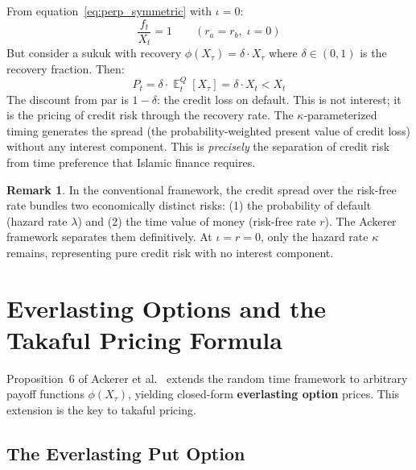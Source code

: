 \documentclass[10pt,twocolumn]{article}
\theoremstyle{plain}
\theoremstyle{definition}
\newtheorem{remark}{Remark}
\DeclareMathOperator{\E}{\mathbb{E}}
\begin{document}
From equation~\eqref{eq:perp_symmetric} with $\iota = 0$:
\begin{equation}
\frac{f_t}{X_t} = 1
\qquad (r_a = r_b,\;\iota = 0)
\label{eq:parity}
\end{equation}
But consider a sukuk with recovery $\phi(X_\tau) = \delta \cdot X_\tau$
where $\delta \in (0,1)$ is the recovery fraction. Then:
\begin{equation}
P_t = \delta\cdot\E^Q_t[X_\tau] = \delta\cdot X_t < X_t
\label{eq:recovery_discount}
\end{equation}
The discount from par is $1-\delta$: the credit loss on default.
This is not interest; it is the pricing of credit risk through
the recovery rate. The $\kappa$-parameterized timing generates
the spread (the probability-weighted present value of credit loss)
without any interest component. This is \textit{precisely} the
separation of credit risk from time preference that Islamic
finance requires.

\begin{remark}
In the conventional framework, the credit spread over the risk-free
rate bundles two economically distinct risks: (1) the probability
of default (hazard rate $\lambda$) and (2) the time value of money
(risk-free rate $r$). The Ackerer framework separates them
definitively. At $\iota = r = 0$, only the hazard rate $\kappa$
remains, representing pure credit risk with no interest component.
\end{remark}

\section{Everlasting Options and the Takaful Pricing Formula}
\label{sec:everlasting}

Proposition~6 of Ackerer et al.\ \cite{Ackerer2024} extends the
random time framework to arbitrary payoff functions $\phi(X_\tau)$,
yielding closed-form \textbf{everlasting option} prices. This
extension is the key to takaful pricing.

\subsection{The Everlasting Put Option}
\end{document}
